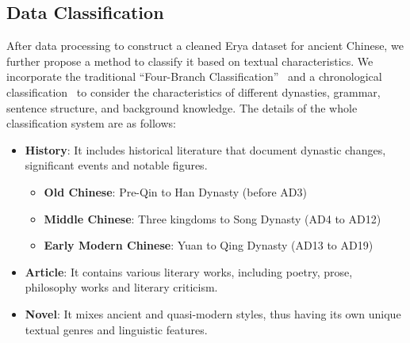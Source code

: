 \subsection{Data Classification}%
After data processing to construct a cleaned Erya dataset for ancient Chinese, we further propose a method to classify it based on textual characteristics. We incorporate the traditional ``Four-Branch Classification''~\cite{sibu} and a chronological classification~\cite{RN02, four} to consider the characteristics of different dynasties, grammar, sentence structure, and background knowledge. The details of the whole classification system are as follows:




\begin{itemize}
    \item \textbf{History}: It includes historical literature that document dynastic changes, significant events and notable figures.
    \begin{itemize}
        \item \textbf{Old Chinese}: Pre-Qin to Han Dynasty (before AD3)
        \item \textbf{Middle Chinese}: Three kingdoms to Song Dynasty (AD4 to AD12)
        \item \textbf{Early Modern Chinese}: Yuan to Qing Dynasty (AD13 to AD19)
    \end{itemize}
    \item \textbf{Article}: It contains various literary works, including poetry, prose, philosophy works and literary criticism. 
    \item \textbf{Novel}: It mixes ancient and quasi-modern styles, thus having its own unique textual genres and linguistic features.
\end{itemize}

